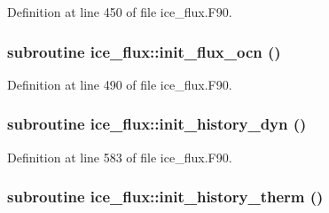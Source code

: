 Definition at line 450 of file ice\_\-flux.F90.\hypertarget{namespaceice__flux_a985af4afe9ebb697857f3f5eaf714545}{
\subsubsection[{init\_\-flux\_\-ocn}]{\setlength{\rightskip}{0pt plus 5cm}subroutine ice\_\-flux::init\_\-flux\_\-ocn ()}}
\label{namespaceice__flux_a985af4afe9ebb697857f3f5eaf714545}


Definition at line 490 of file ice\_\-flux.F90.\hypertarget{namespaceice__flux_adf87450fd972c99fd3d0d4514df29fa9}{
\subsubsection[{init\_\-history\_\-dyn}]{\setlength{\rightskip}{0pt plus 5cm}subroutine ice\_\-flux::init\_\-history\_\-dyn ()}}
\label{namespaceice__flux_adf87450fd972c99fd3d0d4514df29fa9}


Definition at line 583 of file ice\_\-flux.F90.\hypertarget{namespaceice__flux_a510c385b0536089d8f4a00ff9c3701cb}{
\subsubsection[{init\_\-history\_\-therm}]{\setlength{\rightskip}{0pt plus 5cm}subroutine ice\_\-flux::init\_\-history\_\-therm ()}}
\label{namespaceice__flux_a510c385b0536089d8f4a00ff9c3701cb}


